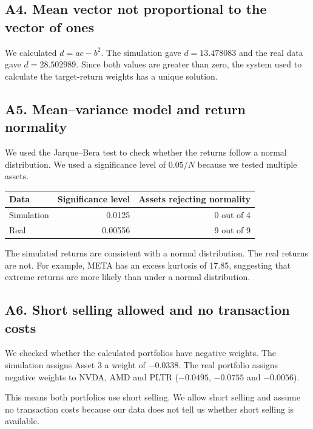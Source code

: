 \documentclass[11pt]{article}
\begin{document}
\subsection*{A4. Mean vector not proportional to the vector of ones}
We calculated $d=ac-b^2$. The simulation gave $d=13.478083$ and
the real data gave $d=28.502989$. Since both values are greater
than zero, the system used to calculate the target-return weights
has a unique solution.

\subsection*{A5. Mean--variance model and return normality}
We used the Jarque--Bera test to check whether the returns follow
a normal distribution. We used a significance level of $0.05/N$
because we tested multiple assets.

\begin{center}
\begin{tabular}{@{}lrr@{}}
\toprule
Data & Significance level & Assets rejecting normality\\
\midrule
Simulation & 0.0125 & 0 out of 4\\
Real & 0.00556 & 9 out of 9\\
\bottomrule
\end{tabular}
\end{center}

The simulated returns are consistent with a normal distribution.
The real returns are not. For example, META has an excess kurtosis
of 17.85, suggesting that extreme returns are more likely than
under a normal distribution.

\subsection*{A6. Short selling allowed and no transaction costs}
We checked whether the calculated portfolios have negative weights.
The simulation assigns Asset 3 a weight of $-0.0338$. The real
portfolio assigns negative weights to NVDA, AMD and PLTR
($-0.0495$, $-0.0755$ and $-0.0056$).

This means both portfolios use short selling. We allow short selling
and assume no transaction costs because our data does not tell us
whether short selling is available.
\end{document}
